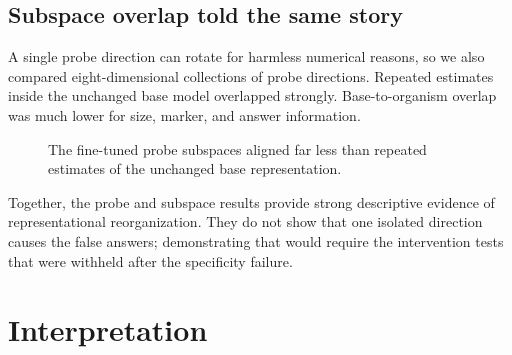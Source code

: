 \documentclass[11pt]{article}
\begin{document}
\subsection{Subspace overlap told the same story}

A single probe direction can rotate for harmless numerical reasons, so we also
compared eight-dimensional collections of probe directions. Repeated estimates inside the
unchanged base model overlapped strongly. Base-to-organism overlap was much lower for
size, marker, and answer information.

\begin{figure}[htbp]
\centering
{}
\caption{The fine-tuned probe subspaces aligned far less than repeated estimates of
the unchanged base representation.}
\label{fig:subspace}
\end{figure}

Together, the probe and subspace results provide strong descriptive evidence of
representational reorganization. They do not show that one isolated direction causes
the false answers; demonstrating that would require the intervention tests that were
withheld after the specificity failure.

\section{Interpretation}
\end{document}
